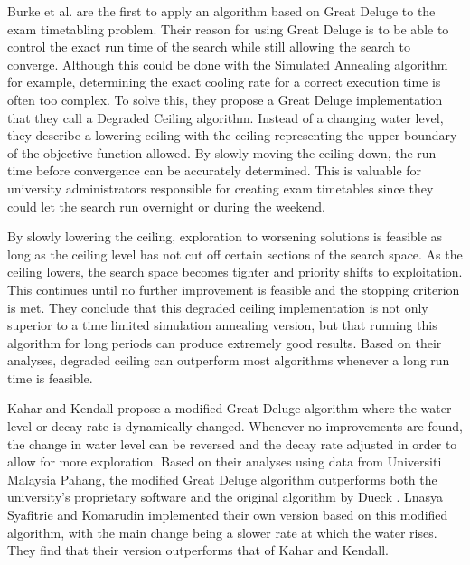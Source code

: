 Burke et al. \cite{burke2004GD} are the first to apply an algorithm based on Great Deluge to the exam timetabling problem. Their reason for using Great Deluge is to be able to control the exact run time of the search while still allowing the search to converge. Although this could be done with the Simulated Annealing algorithm for example, determining the exact cooling rate for a correct execution time is often too complex. To solve this, they propose a Great Deluge implementation that they call a Degraded Ceiling algorithm. Instead of a changing water level, they describe a lowering ceiling with the ceiling representing the upper boundary of the objective function allowed. By slowly moving the ceiling down, the run time before convergence can be accurately determined. This is valuable for university administrators responsible for creating exam timetables since they could let the search run overnight or during the weekend.

By slowly lowering the ceiling, exploration to worsening solutions is feasible as long as the ceiling level has not cut off certain sections of the search space. As the ceiling lowers, the search space becomes tighter and priority shifts to exploitation. This continues until no further improvement is feasible and the stopping criterion is met. They conclude that this degraded ceiling implementation is not only superior to a time limited simulation annealing version, but that running this algorithm for long periods can produce extremely good results. Based on their analyses, degraded ceiling can outperform most algorithms whenever a long run time is feasible.

Kahar and Kendall \cite{kahar2015} propose a modified Great Deluge algorithm where the water level or decay rate is dynamically changed. Whenever no improvements are found, the change in water level can be reversed and the decay rate adjusted in order to allow for more exploration. Based on their analyses using data from Universiti Malaysia Pahang, the modified Great Deluge algorithm outperforms both the university's proprietary software and the original algorithm by Dueck \cite{dueck1993}. Lnasya Syafitrie and Komarudin \cite{Lnasya2022} implemented their own version based on this modified algorithm, with the main change being a slower rate at which the water rises. They find that their version outperforms that of Kahar and Kendall.


